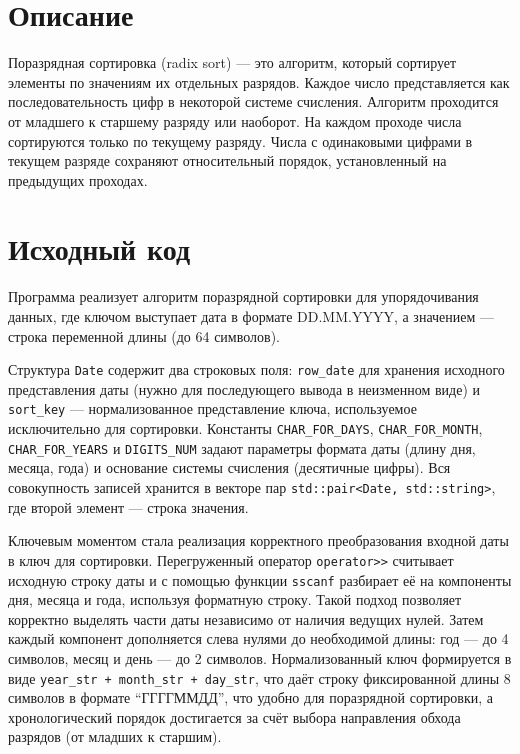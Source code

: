 \section{Описание}
Поразрядная сортировка (radix sort) --- это алгоритм, который сортирует элементы по значениям их отдельных разрядов.
Каждое число представляется как последовательность цифр в некоторой системе счисления. Алгоритм проходится от младшего
к старшему разряду или наоборот. На каждом проходе числа сортируются только по текущему разряду. Числа с одинаковыми
цифрами в текущем разряде сохраняют относительный порядок, установленный на предыдущих проходах.

\pagebreak

\section{Исходный код}
Программа реализует алгоритм поразрядной сортировки для упорядочивания данных, где ключом выступает дата в формате DD.MM.YYYY,
а значением --- строка переменной длины (до 64 символов).

Структура \texttt{Date} содержит два строковых поля: \texttt{row\_date} для хранения исходного представления даты
(нужно для последующего вывода в неизменном виде) и \texttt{sort\_key} --- нормализованное представление ключа,
используемое исключительно для сортировки. Константы \texttt{CHAR\_FOR\_DAYS}, \texttt{CHAR\_FOR\_MONTH},
\texttt{CHAR\_FOR\_YEARS} и \texttt{DIGITS\_NUM} задают параметры формата даты (длину дня, месяца, года)
и основание системы счисления (десятичные цифры). Вся совокупность записей хранится в векторе пар
\texttt{std::pair<Date, std::string>}, где второй элемент --- строка значения.

Ключевым моментом стала реализация корректного преобразования входной даты в ключ для сортировки. Перегруженный оператор
\texttt{operator>>} считывает исходную строку даты и с помощью функции \texttt{sscanf} разбирает её на компоненты дня, месяца и
года, используя форматную строку. Такой подход позволяет корректно выделять части даты
независимо от наличия ведущих нулей. Затем каждый компонент дополняется слева нулями до необходимой длины: год --- до 4
символов, месяц и день --- до 2 символов. Нормализованный ключ формируется в виде \texttt{year\_str + month\_str + day\_str},
что даёт строку фиксированной длины 8 символов в формате \enquote{ГГГГММДД}, что удобно для поразрядной сортировки, а
хронологический порядок достигается за счёт выбора направления обхода разрядов (от младших к старшим).

